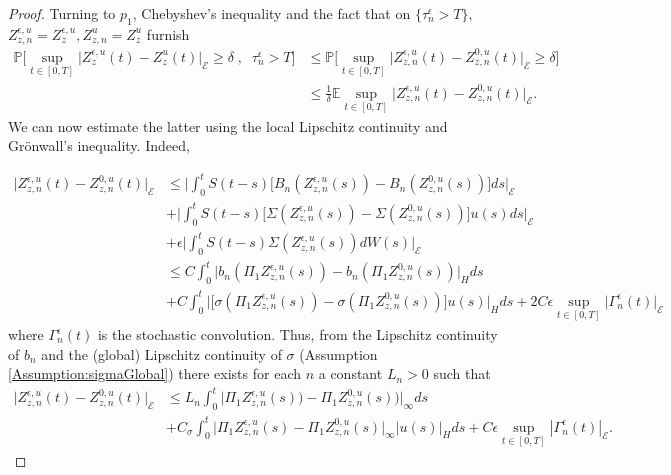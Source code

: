 \documentclass[10pt, reqno]{amsart}
\newcommand{\pr}{\mathbb{P}}
\newcommand{\ex}{\mathbb{E}}
\newcommand{\e}{\mathcal{E}}
\theoremstyle{definition}
\numberwithin{lem}{section}
\numberwithin{cor}{section}
\numberwithin{prop}{section}
\numberwithin{thm}{section}
\numberwithin{dfn}{section}
\begin{document}
\begin{proof}
        Turning to $p_1$, Chebyshev's inequality  and the fact that on $\{ \tau^{\epsilon}_{n}> T \},$ $Z^{\epsilon,u}_{z,n}=Z^{\epsilon,u}_z, Z^{u}_{z,n}=Z^{u}_z$ furnish
    	   \begin{equation}\label{p1bnd}
    	   \begin{aligned}
    	   	\pr\bigg[  \sup_{t\in[0,T]}\big|Z_z^{\epsilon,u}(t)-Z_z^{u}(t)\big|_{\e}\geq \delta\;,\;\; \tau^{\epsilon}_{n}> T\bigg]&\leq  \pr\bigg[  \sup_{t\in[0,T]}\big|Z_{z,n}^{\epsilon,u}(t)-Z_{z,n}^{0,u}(t)\big|_{\e}\geq \delta\bigg]\\&\leq \frac{1}{\delta}\ex\sup_{t\in[0,T]}\big|Z_{z,n}^{\epsilon,u}(t)-Z_{z,n}^{0,u}(t)\big|_{\e}.
    	   \end{aligned}
       \end{equation}
       \noindent We can now estimate the latter using the local Lipschitz continuity and Gr\"onwall's inequality. Indeed,  
    	   
    	   \begin{equation*}
    	   \begin{aligned}
\big|Z_{z,n}^{\epsilon,u}(t)-Z_{z,n}^{0,u}(t)\big|_{\e}&\leq \bigg|\int_{0}^{t}S(t-s)\big[B_n(Z_{z,n}^{\epsilon,u}(s))-B_n(Z_{z,n}^{0,u}(s))\big]ds\bigg|_{\e}\\&+ \bigg|\int_{0}^{t}S(t-s)\big[\Sigma(Z_{z,n}^{\epsilon,u}(s))-\Sigma(Z_{z,n}^{0,u}(s))\big]u(s)ds\bigg|_{\e}\\&
+\epsilon\bigg|\int_{0}^{t}S(t-s)\Sigma(Z_{z,n}^{\epsilon,u}(s))dW(s)\bigg|_{\e}\\&\leq C\int_{0}^{t}\big|b_n(\Pi_1Z_{z,n}^{\epsilon,u}(s))-b_n(\Pi_1Z_{z,n}^{0,u}(s))\big|_{H}ds\\&
+C\int_{0}^{t}\big|\big[\sigma(\Pi_1Z_{z,n}^{\epsilon,u}(s))-\sigma(\Pi_1Z_{z,n}^{0,u}(s))\big]u(s)\big|_{H}ds+2C\epsilon\sup_{t\in[0,T]}\big|\Gamma_n^\epsilon(t)\big|_\e
    	   \end{aligned}
    	   \end{equation*}
where $\Gamma^\epsilon_n(t)$ is the stochastic convolution.
 Thus, from the Lipschitz continuity of $b_n$ and the (global) Lipschitz continuity of $\sigma$ (Assumption \ref{Assumption:sigmaGlobal}) there exists for each $n$ a constant $L_n>0$ such that 
\begin{equation*}
\begin{aligned}
\big|Z_{z,n}^{\epsilon,u}(t)-Z_{z,n}^{0,u}(t)\big|_{\e}&\leq L_n\int_{0}^{t}\big|\Pi_1Z_{z,n}^{\epsilon,u}(s))-\Pi_1Z_{z,n}^{0,u}(s))\big|_{\infty}ds\\&
+C_{\sigma}\int_{0}^{t}\big|\Pi_1Z_{z,n}^{\epsilon,u}(s)-\Pi_1Z_{z,n}^{0,u}(s)\big|_{\infty}|u(s)|_{H}ds+C\epsilon\sup_{t\in[0,T]}|\Gamma_n^\epsilon(t)|_\e.
\end{aligned}
\end{equation*}


\end{proof}
\end{document}
